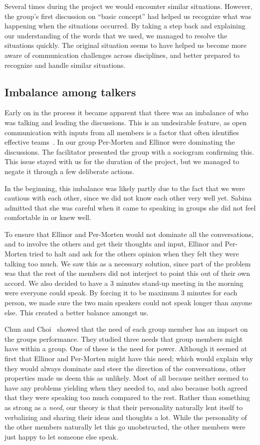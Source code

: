 Several times during the project we would encounter similar situations. However, the group’s first discussion on “basic concept” had helped us recognize what was happening when the situations occurred. By taking a step back and explaining our understanding of the words that we used, we managed to resolve the situations quickly. The original situation seems to have helped us become more aware of communication challenges across disciplines, and better prepared to recognize and handle similar situations.

\subsection{Imbalance among talkers}
Early on in the process it became apparent that there was an imbalance of who was talking and leading the discussions. This is an undesirable feature, as open communication with inputs from all members is a factor that often identifies effective teams~\cite{wheelan}. In our group Per-Morten and Ellinor were dominating the discussions. The facilitator presented the group with a sociogram confirming this.
This issue stayed with us for the duration of the project, but we managed to negate it through a few deliberate actions.

In the beginning, this imbalance was likely partly due to the fact that we were cautious with each other, since we did not know each other very well yet. Sabina admitted that she was careful when it came to speaking in groups she did not feel comfortable in or knew well. 

To ensure that Ellinor and Per-Morten would not dominate all the conversations, and to involve the others and get their thoughts and input, Ellinor and Per-Morten tried to halt and ask for the others opinion when they felt they were talking too much. We saw this as a necessary solution, since part of the problem was that the rest of the members did not interject to point this out of their own accord. We also decided to have a 3 minutes stand-up meeting in the morning were everyone could speak. By forcing it to be maximum 3 minutes for each person, we made sure the two main speakers could not speak longer than anyone else. This created a better balance amongst us.      

Chun and Choi~\cite{2014chin_and_choi} showed that the need of each group member has an impact on the groups performance. They studied three needs that group members might have within a group. One of these is the need for power. Although it seemed at first that Ellinor and Per-Morten might have this need; which would explain why they would always dominate and steer the direction of the conversations, other properties made us deem this as unlikely. Most of all because neither seemed to have any problems yielding when they needed to, and also because both agreed that they were speaking too much compared to the rest. Rather than something as strong as a \textit{need}, our theory is that their personality naturally lent itself to verbalizing and sharing their ideas and thoughts a lot. While the personality of the other members naturally let this go unobstructed, the other members were just happy to let someone else speak.


